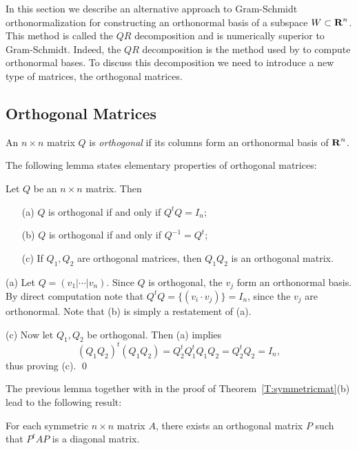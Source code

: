 \label{S:QR}

In this section we describe an alternative approach to Gram-Schmidt
orthonormalization for constructing an orthonormal basis of a subspace
$W\subset\mbox{$\bf{R}$}^n$.  This method is called the $QR$ decomposition and is
numerically
superior to Gram-Schmidt.  Indeed, the $QR$ decomposition is the method used by
\Matlab to compute orthonormal bases.  To discuss this decomposition we need
to introduce a new type of matrices, the orthogonal matrices.

\subsection*{Orthogonal Matrices}

\begin{Def} \label{def:orthmat}
An $n\times n$ matrix $Q$ is {\em orthogonal\/} if its columns form an
orthonormal basis
of $\mbox{$\bf{R}$}^n$.
\end{Def}

The following lemma states elementary properties of orthogonal matrices:
\begin{lemma} \label{lem:orthprop}
Let $Q$ be an $n\times n$ matrix.  Then
\begin{itemize}
\item[(a)] $Q$ is orthogonal if and only if $Q^tQ=I_n$;
\item[(b)] $Q$ is orthogonal if and only if $Q^{-1} = Q^t$;
\item[(c)] If $Q_1,Q_2$ are orthogonal matrices, then $Q_1Q_2$ is
an orthogonal matrix.
\end{itemize}
\end{lemma}
\proof  (a) Let $Q=(v_1|\cdots|v_n)$.  Since $Q$ is orthogonal, the $v_j$
form an orthonormal basis.  By direct computation note that
$Q^tQ=\{(v_i\cdot v_j)\}=I_n$, since the $v_j$ are orthonormal. Note that
(b) is simply a restatement of (a).

\noindent (c) Now let $Q_1,Q_2$ be orthogonal. Then (a) implies
\[
(Q_1Q_2)^t(Q_1Q_2) = Q_2^tQ_1^tQ_1Q_2 = Q_2^tQ_2 = I_n,
\]
thus proving (c).  \qed

The previous lemma together with  in the proof of
Theorem~\ref{T:symmetricmat}(b) lead to the following result:
\begin{prop}  For each symmetric $n\times n$ matrix $A$, there exists an
orthogonal matrix $P$ such that $P^tAP$ is a diagonal matrix.
\end{prop}

